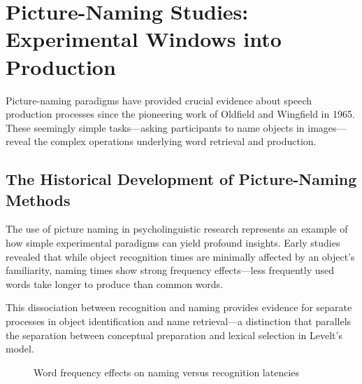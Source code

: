 \documentclass[12pt,a4paper]{article}
\begin{document}
\section{Picture-Naming Studies: Experimental Windows into Production}

Picture-naming paradigms have provided crucial evidence about speech production processes since the pioneering work of Oldfield and Wingfield in 1965. These seemingly simple tasks—asking participants to name objects in images—reveal the complex operations underlying word retrieval and production.

\subsection{The Historical Development of Picture-Naming Methods}

The use of picture naming in psycholinguistic research represents an example of how simple experimental paradigms can yield profound insights. Early studies revealed that while object recognition times are minimally affected by an object's familiarity, naming times show strong frequency effects—less frequently used words take longer to produce than common words.

This dissociation between recognition and naming provides evidence for separate processes in object identification and name retrieval—a distinction that parallels the separation between conceptual preparation and lexical selection in Levelt's model.

\begin{figure}[h]
\centering
{}
\caption{Word frequency effects on naming versus recognition latencies}
\label{fig:naming_latencies}
\end{figure}
\end{document}
